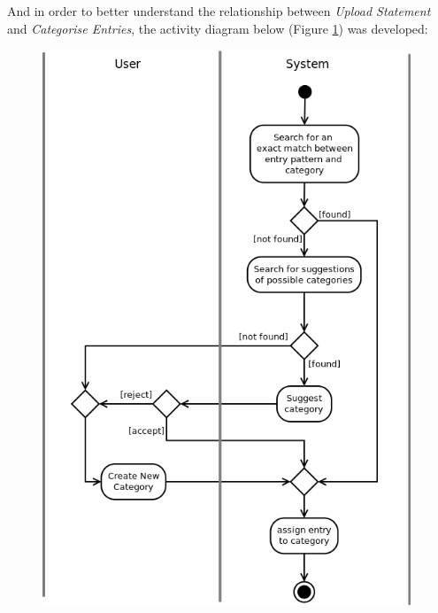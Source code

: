 And in order to better understand the relationship between \emph{Upload
Statement} and \emph{Categorise Entries}, the activity diagram below (Figure
\ref{fig:AD.CategoriseEntries}) was developed:
\begin{figure}[ht!]
  \begin{center}
    \includegraphics[width=11cm]{./contents/img/Activity_Diagram_-_Categorise_Entries.png}
  \end{center}
  \caption{}
  \label{fig:AD.CategoriseEntries}
\end{figure}
\FloatBarrier

